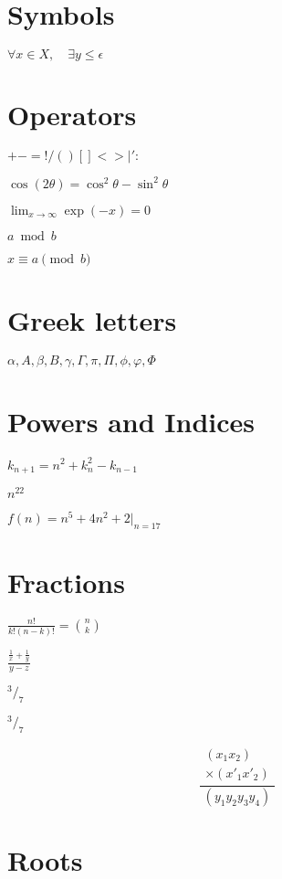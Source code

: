 \documentclass{article}
\begin{document}
\section{Symbols}
$\forall x \in X, \quad \exists y \leq \epsilon$

\section{Operators}
$+ - = ! / ( ) [ ] < > | ' :$

$\cos (2\theta) = \cos^2 \theta - \sin^2 \theta$

$\lim_{x \to \infty} \exp(-x) = 0$

$a \bmod b$

$x \equiv a \pmod b$


\section{Greek letters}
$\alpha, A, \beta, B, \gamma, \Gamma, \pi, \Pi, \phi, \varphi, \Phi$

\section{Powers and Indices}

$k_{n+1} = n^2 + k_n^2 - k_{n-1}$

$n^{22}$

$f(n) = n^5 + 4n^2 + 2 |_{n=17}$


\section{Fractions}

$\frac{n!}{k!(n-k)!} = \binom{n}{k}$



$\frac{\frac{1}{x}+\frac{1}{y}}{y-z}$



$^3/_7$

$\newcommand{\rfrac}[2]{{}^{#1}\!/_{#2}}
\rfrac{3}{7}$


\begin{equation}
\frac{
    \begin{array}{rr}
      \left( x_1 x_2 \right)\\
      \times \left( x'_1 x'_2 \right)
    \end{array}
  }{
    \left( y_1y_2y_3y_4 \right)
  }
\end{equation}


\section{Roots}
\end{document}
